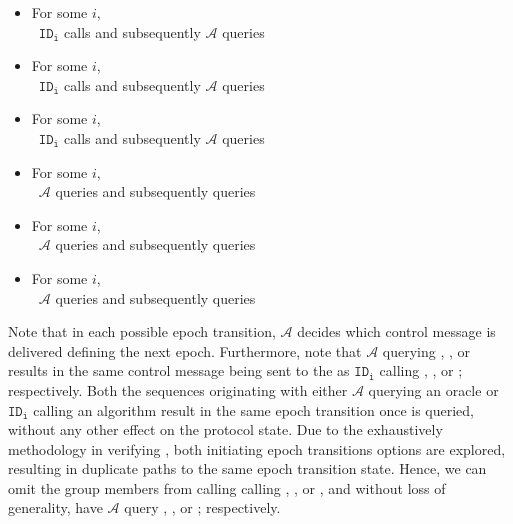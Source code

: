 \begin{itemize}
  \item For some \(i\),\\~\hspace{4em}\(\mathtt{ID_i}\) calls  and subsequently \(\mathcal{A}\) queries 
  \item For some \(i\),\\~\hspace{4em}\(\mathtt{ID_i}\) calls  and subsequently \(\mathcal{A}\) queries 
  \item For some \(i\),\\~\hspace{4em}\(\mathtt{ID_i}\) calls  and subsequently \(\mathcal{A}\) queries 
  \item For some \(i\),\\~\hspace{4em}\(\mathcal{A}\) queries     and subsequently queries 
  \item For some \(i\),\\~\hspace{4em}\(\mathcal{A}\) queries  and subsequently queries 
  \item For some \(i\),\\~\hspace{4em}\(\mathcal{A}\) queries  and subsequently queries 
\end{itemize}

Note that in each possible epoch transition, \(\mathcal{A}\) decides which control message is delivered defining the next epoch.
Furthermore, note that \(\mathcal{A}\) querying , , or  results in the same control message being sent to the  as \(\mathtt{ID_i}\) calling , , or ; respectively.
Both the sequences originating with either \(\mathcal{A}\) querying an oracle or \(\mathtt{ID_i}\) calling an algorithm result in the same epoch transition once  is queried, without any other effect on the protocol state.
Due to the exhaustively methodology in verifying , both initiating epoch transitions options are explored, resulting in duplicate paths to the same epoch transition state.
Hence, we can omit the group members from calling calling , , or , and without loss of generality, have \(\mathcal{A}\) query , , or ; respectively.

